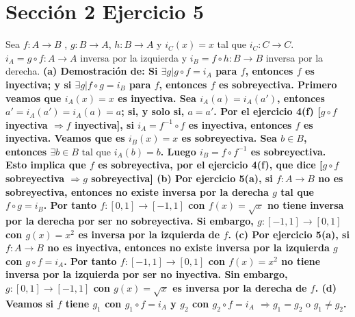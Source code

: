\documentclass{article}
\begin{document}
\section{Sección 2 Ejercicio 5 }

Sea \(f : A \longrightarrow B\) , \(g: B \longrightarrow A\), \(h : B \longrightarrow A\) y \(i_C(x)=x\) tal que \(i_C:C\longrightarrow C\). \(i_A= g\circ f: A\longrightarrow A \) inversa por la izquierda y \(i_B= f\circ h: B\longrightarrow B \) inversa por la derecha.
\newline
\bf (a) \rm Demostración de: Si \( \exists g | g \circ f = i_A\) para \(f\), entonces \(f\) es inyectiva; y si \(\exists g | f\circ g = i_B\) para \(f\), entonces \(f\) es sobreyectiva.
\newline
Primero veamos que \( i_A (x)=x  \) es inyectiva. Sea \(i_A(a)=i_A(a')\), entonces \(a'=i_A(a')=i_A(a)=a\); si, y solo si, \(a=a'\).
\newline
Por el ejercicio 4(f) [\(g \circ f\) inyectiva \( \Rightarrow f \) inyectiva], si \(i_A=f^{-1}\circ f\) es inyectiva, entonces \(f\) es inyectiva.
\newline
Veamos que es \( i_B (x)=x  \) es sobreyectiva. Sea \(b \in B\), entonces \(\exists b\in B \text{ tal que } i_A(b)=b\). Luego \(i_B = f \circ f^{-1} \) es sobreyectiva. Esto implica que \(f\) es sobreyectiva, por el ejercicio 4(f), que dice [\(g \circ f \) sobreyectiva \(\Rightarrow  g\) sobreyectiva]
\newline
\bf (b) \rm Por ejercicio 5(a), si \(f: A \longrightarrow B\) no es sobreyectiva, entonces no existe inversa por la derecha \(g\) tal que \(f \circ g =i_B\). Por tanto \(f: [0,1] \longrightarrow [-1,1]\) con \(f(x)= \sqrt x\) no tiene inversa por la derecha por ser no sobreyectiva. Si embargo, \(g:[-1,1] \longrightarrow [0,1]\) con \(g(x)= x^2\) es inversa por la izquierda de \(f\).
\newline
\bf (c) \rm Por ejercicio 5(a), si \(f: A \longrightarrow B\) no es inyectiva, entonces no existe inversa por la izquierda \(g\) con \(g \circ f = i_A\). Por tanto \(f: [-1,1] \longrightarrow [0,1]\) con \(f(x)= x^2\) no tiene inversa por la izquierda por ser no inyectiva. Sin embargo, \(g:[0,1] \longrightarrow [-1,1]\) con \(g(x)= \sqrt x\) es inversa por la derecha de \(f\).
\newline
\bf (d) \rm Veamos si \(f\) tiene \(g_1\) con \(g_1 \circ f = i_A\) y \(g_2\) con \(g_2 \circ f = i_A\)  \(\Rightarrow g_1=g_2 \text{ o } g_1 \neq g_2 \).
\newline
\end{document}
